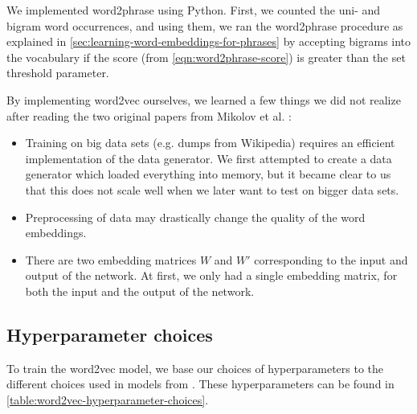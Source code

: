 We implemented word2phrase using Python. First, we counted the uni- and bigram word occurrences, and using them, we ran the word2phrase procedure as explained in \cref{sec:learning-word-embeddings-for-phrases} by accepting bigrams into the vocabulary if the score (from \cref{eqn:word2phrase-score}) is greater than the set threshold parameter.

By implementing word2vec ourselves, we learned a few things we did not realize after reading the two original papers from Mikolov et al. \cite{mikolov2013a, mikolov2013b}:
\begin{itemize}
    \item Training on big data sets (e.g. dumps from Wikipedia) requires an efficient implementation of the data generator. We first attempted to create a data generator which loaded everything into memory, but it became clear to us that this does not scale well when we later want to test on bigger data sets.
    \item Preprocessing of data may drastically change the quality of the word embeddings.
    \item There are two embedding matrices $W$ and $W'$ corresponding to the input and output of the network. At first, we only had a single embedding matrix, for both the input and the output of the network.
\end{itemize}

\subsection{Hyperparameter choices}
\label{sec:word2vec-hyperparameter-choices}
To train the word2vec model, we base our choices of hyperparameters to the different choices used in models from \cite{mikolov2013a, mikolov2013b}. These hyperparameters can be found in \cref{table:word2vec-hyperparameter-choices}.

